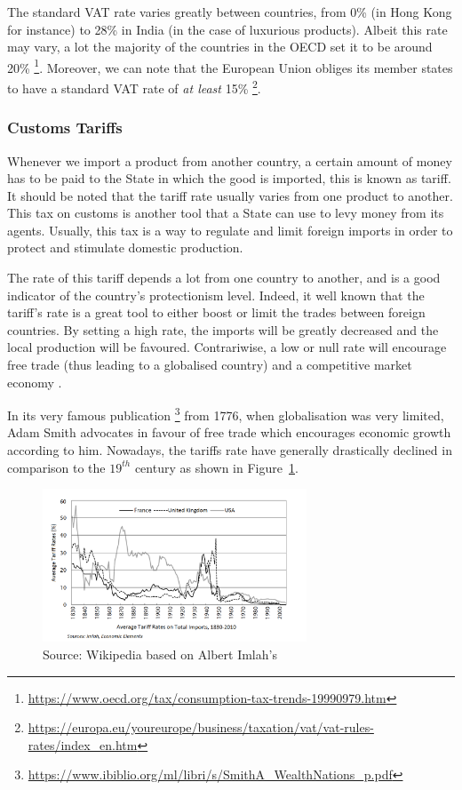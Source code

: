    The standard VAT rate varies greatly between countries, from 0\% (in Hong Kong for instance) to 28\% in India (in the case of luxurious products). Albeit this rate may vary, a lot the majority of the countries in the OECD set it to be around 20\% \footnote{\url{https://www.oecd.org/tax/consumption-tax-trends-19990979.htm}}. Moreover, we can note that the European Union obliges its member states to have a standard VAT rate of \emph{at least} 15\% \footnote{\url{https://europa.eu/youreurope/business/taxation/vat/vat-rules-rates/index_en.htm}}.
    
    
    \subsubsection{Customs Tariffs}
    
    Whenever we import a product from another country, a certain amount of money has to be paid to the State in which the good is imported, this is known as tariff. It should be noted that the tariff rate usually varies from one product to another. This tax on customs is another tool that a State can use to levy money from its agents. Usually, this tax is a way to regulate and limit foreign imports in order to protect and stimulate domestic production.
    
    The rate of this tariff depends a lot from one country to another, and is a good indicator of the country's protectionism level. Indeed, it well known that the tariff's rate is a great tool to either boost or limit the trades between foreign countries. By setting a high rate, the imports will be greatly decreased and the local production will be favoured. Contrariwise, a low or null rate will encourage  free trade (thus leading to a globalised country) and a competitive market economy \cite{virmani2002towards}.
    
    In its very famous publication \footnote{\url{https://www.ibiblio.org/ml/libri/s/SmithA_WealthNations_p.pdf}} from 1776, when globalisation was very limited, Adam Smith advocates in favour of free trade which encourages economic growth according to him. Nowadays, the tariffs rate have generally drastically declined in comparison to the $19^{th}$ century as shown in Figure~\ref{fig:average_tariffs_history}.
    
    \begin{figure}[H]
        \centering
        \includegraphics[width=0.7\textwidth]{img/avg_tariff_rates_US_FR_UK.png}
        \caption{Source: Wikipedia based on Albert Imlah's }
        \label{fig:average_tariffs_history}
    \end{figure}
    
